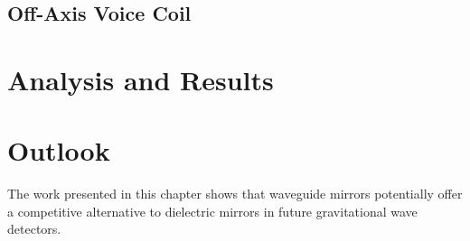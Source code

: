 \subsection{Off-Axis Voice Coil}

\section{Analysis and Results}

\section{Outlook}

The work presented in this chapter shows that waveguide mirrors potentially offer a competitive alternative to dielectric mirrors in future gravitational wave detectors.

